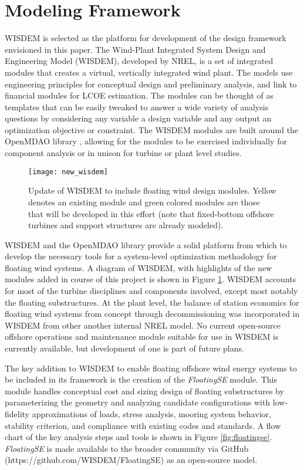 \section{Modeling Framework}
WISDEM is selected as the platform for development of the design
framework envisioned in this paper.  The Wind-Plant Integrated System
Design and Engineering Model (WISDEM), developed by NREL, is a set of
integrated modules that creates a virtual, vertically integrated wind
plant. The models use engineering principles for conceptual design and
preliminary analysis, and link to financial modules for LCOE
estimation. The modules can be thought of as templates that can
be easily tweaked to answer a wide variety of analysis questions by considering any variable
a design variable and any output an optimization objective or
constraint. The WISDEM modules are built around the OpenMDAO library \citep{openmdao},
allowing for the modules to be exercised individually for component
analysis or in unison for turbine or plant level studies.  

\begin{figure}[htbp]
  \begin{center}
    \texttt{[image: new\_wisdem]}\\
    \caption{Update of WISDEM to include floating wind design modules.
      Yellow denotes an existing module and green colored modules are
      those that will be developed in this effort (note that
      fixed-bottom offshore turbines and support structures are already
      modeled).}
    \label{fig:wisdem}
  \end{center}
\end{figure}

WISDEM and the OpenMDAO library provide a solid platform from which to
develop the necessary tools for a system-level optimization methodology
for floating wind systems.  A diagram of WISDEM, with highlights of the
new modules added in course of this project is shown in Figure
\ref{fig:wisdem}.  WISDEM accounts for most of the turbine disciplines
and components involved, except most notably the floating substructures.
At the plant level, the balance of station economics for floating wind
systems from concept through decommissioning was incorporated in WISDEM
from other another internal NREL model.  No current open-source offshore
operations and maintenance module suitable for use in WISDEM is
currently available, but development of one is part of future plans.

The key addition to WISDEM to enable floating offshore wind energy
systems to be included in its framework is the creation of the
\textit{FloatingSE} module.  This module handles conceptual cost and
sizing design of floating substructures by parameterizing the geometry
and analyzing candidate configurations with low-fidelity approximations
of loads, stress analysis, mooring system behavior, stability criterion,
and compliance with existing codes and standards.  A flow chart of the
key analysis steps and tools is shown in Figure \ref{fig:floatingse}.
\textit{FloatingSE} is made available to the broader community via
GitHub (https://github.com/WISDEM/FloatingSE) as an open-source model.

